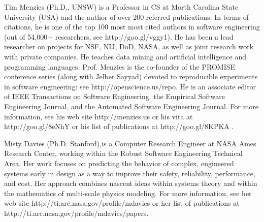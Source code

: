 \documentclass[10pt,journal,compsoc]{IEEEtran}
\begin{document}
\begin{IEEEbiography}{Tim Menzies} (Ph.D., UNSW)
is a Professor in CS at Morth Carolina State University (USA) and  the author of
over 200 referred publications. In terms of citations, he is one of the top 100 most
most cited
authors in  software engineering (out of 54,000+ researchers, see
http://goo.gl/vggy1). He has been a lead researcher on
projects for NSF, NIJ, DoD, NASA, as well as joint research work with
private companies. He teaches data mining and artificial intelligence
and programming languages. Prof. Menzies is the co-founder of the
PROMISE conference series (along with Jelber Sayyad) devoted to reproducible experiments in
software engineering: see http://openscience.us/repo. He is an
associate editor of IEEE Transactions on Software Engineering. the Empirical Software Engineering Journal, and the
Automated Software Engineering Journal.  For more information, see his web site http://menzies.us
or his vita at http://goo.gl/8eNhY or his list of publications at
http://goo.gl/8KPKA .
\end{IEEEbiography}
 
\begin{IEEEbiography}{Misty Davies}
(Ph.D. Stanford),is a Computer Research Engineer at
  NASA Ames Research Center, working within the
  Robust Software Engineering Technical Area.  Her
  work focuses on predicting the behavior of
  complex, engineered systems early in design as a
  way to improve their safety, reliability,
  performance, and cost. Her approach combines
  nascent ideas within systems theory and within the
  mathematics of multi-scale physics modeling.
For more information, see her web site http://ti.arc.nasa.gov/profile/mdavies
or her  list of publications at
http://ti.arc.nasa.gov/profile/mdavies/papers.
\end{IEEEbiography}


\clearpage
 \setcounter{page}{1}

\onecolumn
 \setcounter{page}{1}

\renewcommand\thefigure{\thesection.\arabic{figure}}   
\setcounter{figure}{0}    

\appendix
\end{document}
